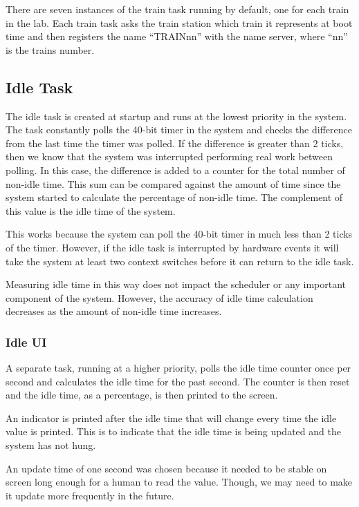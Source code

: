 \documentclass[pdftex,10pt,a4paper]{article}
\begin{document}
There are seven instances of the train task running by default, one
for each train in the lab. Each train task asks the train station
which train it represents at boot time and then registers the
name ``TRAINnn'' with the name server, where ``nn'' is the trains
number.

\subsection*{Idle Task}

The idle task is created at startup and runs at the lowest priority in
the system. The task constantly polls the 40-bit timer in the system
and checks the difference from the last time the timer was polled. If
the difference is greater than 2 ticks, then we know that the system
was interrupted performing real work between polling. In this case,
the difference is added to a counter for the total number of non-idle
time. This sum can be compared against the amount of time since the
system started to calculate the percentage of non-idle time. The
complement of this value is the idle time of the system.

This works because the system can poll the 40-bit timer in much less
than 2 ticks of the timer. However, if the idle task is interrupted by
hardware events it will take the system at least two context switches
before it can return to the idle task.

Measuring idle time in this way does not impact the scheduler or any
important component of the system. However, the accuracy of idle time
calculation decreases as the amount of non-idle time increases.

\subsubsection*{Idle UI}

A separate task, running at a higher priority, polls the idle time
counter once per second and calculates the idle time for the past
second. The counter is then reset and the idle time, as a percentage,
is then printed to the screen.

An indicator is printed after the idle time that will change every
time the idle value is printed. This is to indicate that the idle time
is being updated and the system has not hung.

An update time of one second was chosen because it needed to be stable
on screen long enough for a human to read the value. Though, we may
need to make it update more frequently in the future.
\end{document}
